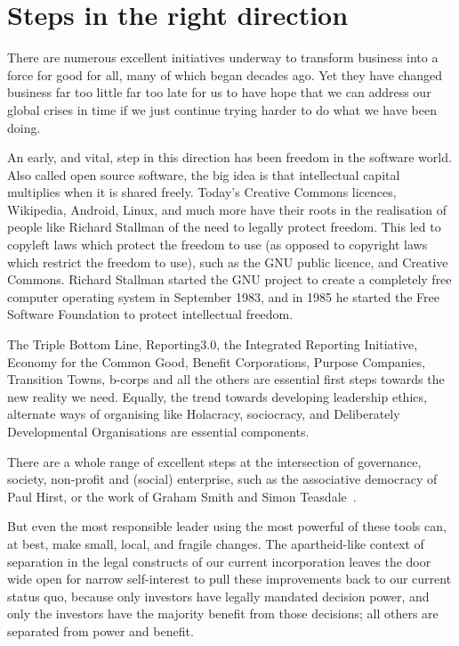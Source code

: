 \section{Steps in the right direction}
There are numerous excellent initiatives underway to transform business into a force for good for all, many of which began decades ago. Yet they have changed business far too little far too late for us to have hope that we can address our global crises in time if we just continue trying harder to do what we have been doing.


An early, and vital, step in this direction has been freedom in the software world. Also called open source software, the big idea is that intellectual capital multiplies when it is shared freely.  Today's Creative Commons licences, Wikipedia, Android, Linux, and much more have their roots in the realisation of people like Richard Stallman\cite{williams-free} of the need to legally protect freedom. This led to copyleft laws which protect the freedom to use (as opposed to copyright laws which restrict the freedom to use), such as the GNU public licence, and Creative Commons. Richard Stallman started the GNU project to create a completely free computer operating system in September 1983, and in 1985 he started the Free Software Foundation to protect intellectual freedom. 


The Triple Bottom Line\cite{elkington-triple}, Reporting3.0, the Integrated Reporting Initiative, Economy for the Common Good, Benefit Corporations, Purpose Companies, Transition Towns, b-corps and all the others are essential first steps towards the new reality we need. Equally, the trend towards developing leadership ethics, alternate ways of organising like Holacracy\cite{robertson-holacracy}, sociocracy\cite{rau-sociocracy}, and Deliberately Developmental Organisations\cite{kegan-everyone} are essential components.


There are a whole range of excellent steps at the intersection of governance, society, non-profit and (social) enterprise, such as the associative democracy of Paul Hirst, or the work of Graham Smith and Simon Teasdale~\cite{smith-teasdale-associative}.


But even the most responsible leader using the most powerful of these tools can, at best, make small, local, and fragile changes. The apartheid-like context of separation in the legal constructs of our current incorporation leaves the door wide open for narrow self-interest to pull these improvements back to our current status quo, because only investors have legally mandated decision power, and only the investors have the majority benefit from those decisions; all others are separated from power and benefit.


